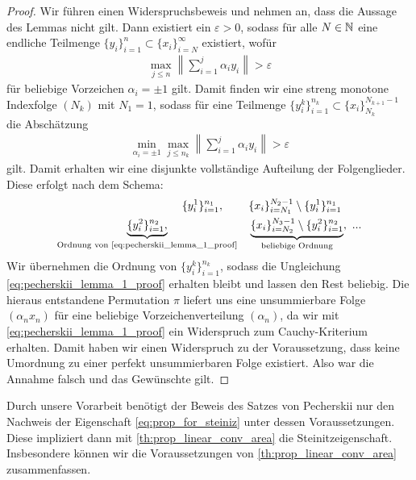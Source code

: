 \begin{proof}
	Wir führen einen Widerspruchsbeweis und nehmen an, dass die Aussage des Lemmas nicht gilt. Dann existiert ein $ \varepsilon > 0 $, sodass für alle $ N \in \mathbb{N} $ eine endliche Teilmenge $ \{y_i \}_{i = 1}^n \subset \{x_i\}_{i=N}^\infty $ existiert, wofür 
	\begin{align*}
		\max \limits_{j \leq n } 
		\left\|
		\sum \limits_{i = 1}^j \alpha_i y_i
		\right\|
		> \varepsilon
	\end{align*}
	für beliebige Vorzeichen $ \alpha_i = \pm 1 $ gilt.
	Damit finden wir eine streng monotone Indexfolge $ (N_k) $ mit $ N_1 = 1 $, sodass für eine Teilmenge  $ \{y_i^k\}_{i = 1}^{n_k} \subset \{x_i\}_{N_k}^{N_{k+1} - 1} $ die Abschätzung 
	\begin{align}\label{eq:pecherskii_lemma_1_proof}
		\min \limits_{\alpha_i = \pm 1}
		\max \limits_{j \leq n_k}
		\left\|
		\sum \limits_{i = 1}^j \alpha_i y_i
		\right\|
		> \varepsilon
	\end{align}
	gilt.
	Damit erhalten wir eine disjunkte vollständige Aufteilung der Folgenglieder.
	Diese erfolgt nach dem Schema:
	\begin{align*}
		\{y^1_i\}_{i =1}^{n_1} , \quad \
		&\quad 
		\{x_i\}_{i = N_1}^{N_2 - 1} \setminus \{y^1_i\}_{i =1}^{n_1}\\
		\underbrace{\{y^2_i\}_{i =1}^{n_2},}_{\textrm{Ordnung von \eqref{eq:pecherskii_lemma_1_proof}}}
		&\quad 
		\underbrace{\{x_i\}_{i = N_2}^{N_3 - 1} \setminus \{y^2_i\}_{i =1}^{n_2}}_{\textrm{beliebige Ordnung}} , \ ...
	\end{align*}
	Wir übernehmen die Ordnung von $\{y^k_i\}_{i =1}^{n_k}  $, sodass die Ungleichung \eqref{eq:pecherskii_lemma_1_proof} erhalten bleibt und lassen den Rest beliebig.
	Die hieraus entstandene Permutation $ \pi  $ liefert uns eine unsummierbare Folge
	$ (\alpha_n x_n) $ für eine beliebige Vorzeichenverteilung $ (\alpha_n) $,
	da wir mit \eqref{eq:pecherskii_lemma_1_proof} ein Widerspruch zum Cauchy-Kriterium erhalten.
	Damit haben wir einen Widerspruch zu der Voraussetzung, dass keine Umordnung zu einer perfekt unsummierbaren Folge existiert. Also war die Annahme falsch und das Gewünschte gilt.
\end{proof}
Durch unsere Vorarbeit benötigt der Beweis des Satzes von Pecherskii nur den Nachweis der Eigenschaft \eqref{eq:prop_for_steiniz} unter dessen Voraussetzungen.
Diese impliziert dann mit \ref{th:prop_linear_conv_area} die Steinitzeigenschaft.
Insbesondere können wir die Voraussetzungen von \ref{th:prop_linear_conv_area} zusammenfassen.
